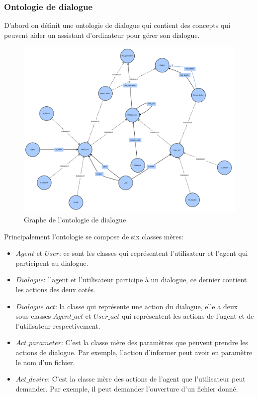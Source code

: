 \subsubsection{Ontologie de dialogue}
D'abord on définit une ontologie de dialogue qui contient des concepts qui peuvent aider un assistant d'ordinateur pour gérer son dialogue.
\begin{figure}[H] 
	
	\centering
	\includegraphics[width=0.95\linewidth]{images/Conception/DM/main_onto.png}
	\caption{Graphe de l'ontologie de dialogue}
\end{figure}\label{mail_onto}
Principalement l'ontologie se compose de six classes mères:
\begin{itemize}
	\item $Agent$ et $User$: ce sont les classes qui représentent l'utilisateur et l'agent qui participent au dialogue.
	\item $Dialogue$: l'agent et l'utilisateur participe à un dialogue, ce dernier contient les actions des deux cotés.
	\item $Dialogue\_act$: la classe qui représente une action du dialogue, elle a deux sous-classes $Agent\_act$ et $User\_act$ qui représentent les actions de l'agent et de l'utilisateur respectivement.
	\item $Act\_parameter$: C'est la classe mère des paramètres que peuvent prendre les actions de dialogue. Par exemple, l'action d'informer peut avoir en paramètre le nom d'un fichier.
	\item $Act\_desire$: C'est la classe mère des actions de l'agent que l'utilisateur peut demander. Par exemple, il peut demander l'ouverture d'un fichier donné.
\end{itemize}

